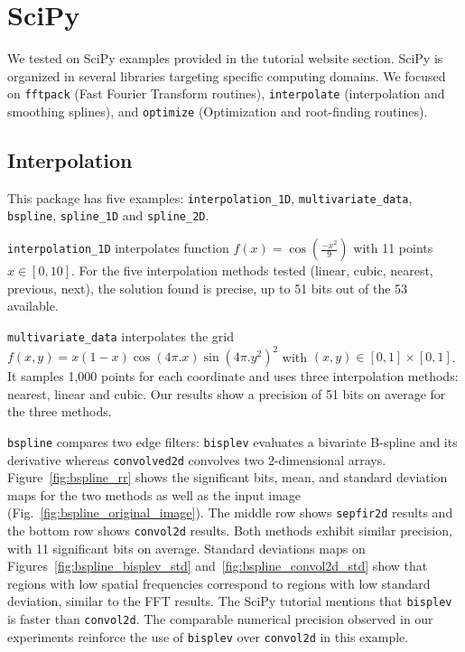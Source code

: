 
\section{SciPy}
We tested \pytracer on SciPy examples provided in the tutorial website section.
SciPy is organized in several libraries targeting specific computing domains. We
focused on \texttt{fftpack} (Fast Fourier Transform routines),
\texttt{interpolate} (interpolation and smoothing splines), and
\texttt{optimize} (Optimization and root-finding routines).

\subsection{Interpolation}

This package has five examples: \texttt{interpolation\_1D},
\texttt{multivariate\_data}, \texttt{bspline}, \texttt{spline\_1D} and
\texttt{spline\_2D}.

\texttt{interpolation\_1D} interpolates function $f(x)=\cos(\frac{-x^2}{9})$
with 11 points $x\in[0,10]$. For the five interpolation methods tested (linear,
cubic, nearest, previous, next), the solution found is precise, up to 51 bits
out of the 53 available.

\texttt{multivariate\_data} interpolates the grid $f(x,y)=x(1-x)\cos(4\pi.x)
    \sin(4\pi.y^2)^2$ with $(x,y) \in [0,1] \times [0,1]$. It samples 1,000 points
for each coordinate and uses three interpolation methods: nearest, linear and
cubic. Our results show a precision of 51 bits on average for the three methods.


\texttt{bspline} compares two edge filters: \texttt{bisplev} evaluates a
bivariate B-spline and its derivative whereas \texttt{convolved2d} convolves two
2-dimensional arrays. Figure~\ref{fig:bspline_rr} shows the significant bits,
mean, and standard deviation maps for the two methods as well as the input image
(Fig.~\ref{fig:bspline_original_image}). The middle row shows \texttt{sepfir2d}
results and the bottom row shows \texttt{convol2d} results. Both methods exhibit
similar precision, with 11 significant bits on average. Standard deviations maps
on Figures~\ref{fig:bspline_bisplev_std} and~\ref{fig:bspline_convol2d_std} show
that regions with low spatial frequencies correspond to regions with low
standard deviation, similar to the FFT results. The SciPy tutorial mentions that
\texttt{bisplev} is faster than \texttt{convol2d}. The comparable numerical
precision observed in our experiments reinforce the use of \texttt{bisplev} over
\texttt{convol2d} in this example.

